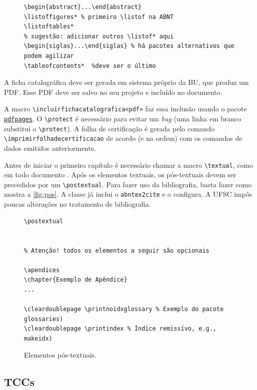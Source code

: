 \documentclass[embeddedlogo]{../ufsc-thesis-rn46-2019}
\newcommand{\lacmd}[1]{\texttt{\textbackslash{}#1}}
\begin{document}
\begin{figure}[tb]
\begin{verbatim}
\begin{abstract}...\end{abstract}
\listoffigures* % primeiro \listof na ABNT
\listoftables*  
% sugestão: adicionar outros \listof* aqui
\begin{siglas}...\end{siglas} % há pacotes alternativos que podem agilizar
\tableofcontents*  %deve ser o último
  \end{verbatim}
\end{figure}

A ficha catalográfica deve ser gerada em sistema próprio da BU, que produz um
PDF. Esse PDF deve ser salvo no seu projeto e incluído no documento.

A macro \lacmd{incluirfichacatalografica{<pdf>}} faz essa inclusão usando o
pacote \href{https://www.ctan.org/pkg/pdfpages}{\texttt{pdfpages}}. O
\lacmd{protect} é necessário para evitar um \emph{bug} (uma linha em branco
substitui o \lacmd{protect}).  A folha de certificação é gerada pelo comando
\lacmd{imprimirfolhadecertificacao} de acordo (e na ordem) com os comandos de
dados emitidos anteriormente.

Antes de iniciar o primeiro capítulo é necessário chamar a macro
\lacmd{textual}, como em todo documento \abnTeX. Após os elementos textuais, os
pós-textuais devem ser precedidos por um \lacmd{postextual}. Para fazer uso da
bibliografia, basta fazer como mostra a \autoref{fig:pos}. A classe já inclui o
\texttt{abntex2cite} e o configura. A UFSC impôs poucas alterações no tratamento
de bibliografia.

\begin{figure}[tb]
  \centering
  \caption{Elementos pós-textuais.}
  \label{fig:pos}
  \begin{verbatim}
\postextual


% Atenção! todos os elementos a seguir são opcionais

\apendices
\chapter{Exemplo de Apêndice}
...

\cleardoublepage \printnoidxglossary % Exemplo do pacote glossaries)
\cleardoublepage \printindex % Índice remissívo, e.g., makeidx)
  \end{verbatim}
\end{figure}

\subsection{TCCs}
\label{sec:tcc}
\end{document}
